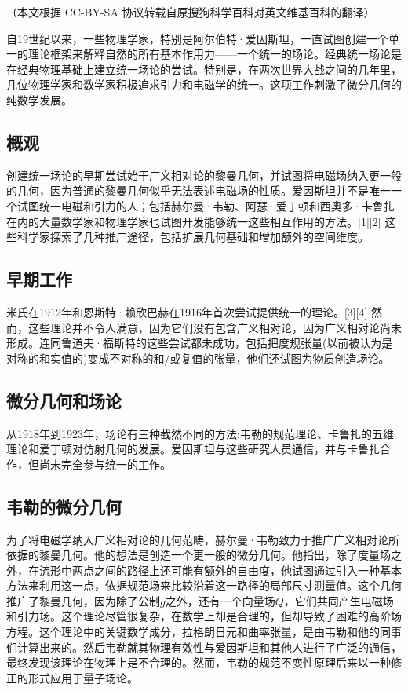 
（本文根据 CC-BY-SA 协议转载自原搜狗科学百科对英文维基百科的翻译）

自19世纪以来，一些物理学家，特别是阿尔伯特·爱因斯坦，一直试图创建一个单一的理论框架来解释自然的所有基本作用力——一个统一的场论。经典统一场论是在经典物理基础上建立统一场论的尝试。特别是，在两次世界大战之间的几年里，几位物理学家和数学家积极追求引力和电磁学的统一。这项工作刺激了微分几何的纯数学发展。

\subsection{概观}

创建统一场论的早期尝试始于广义相对论的黎曼几何，并试图将电磁场纳入更一般的几何，因为普通的黎曼几何似乎无法表述电磁场的性质。爱因斯坦并不是唯一一个试图统一电磁和引力的人；包括赫尔曼·韦勒、阿瑟·爱丁顿和西奥多·卡鲁扎在内的大量数学家和物理学家也试图开发能够统一这些相互作用的方法。[1][2] 这些科学家探索了几种推广途径，包括扩展几何基础和增加额外的空间维度。

\subsection{早期工作}

米氏在1912年和恩斯特·赖欣巴赫在1916年首次尝试提供统一的理论。[3][4] 然而，这些理论并不令人满意，因为它们没有包含广义相对论，因为广义相对论尚未形成。连同鲁道夫·福斯特的这些尝试都未成功，包括把度规张量(以前被认为是对称的和实值的)变成不对称的和/或复值的张量，他们还试图为物质创造场论。

\subsection{微分几何和场论}

从1918年到1923年，场论有三种截然不同的方法:韦勒的规范理论、卡鲁扎的五维理论和爱丁顿对仿射几何的发展。爱因斯坦与这些研究人员通信，并与卡鲁扎合作，但尚未完全参与统一的工作。

\subsection{韦勒的微分几何}

为了将电磁学纳入广义相对论的几何范畴，赫尔曼·韦勒致力于推广广义相对论所依据的黎曼几何。他的想法是创造一个更一般的微分几何。他指出，除了度量场之外，在流形中两点之间的路径上还可能有额外的自由度，他试图通过引入一种基本方法来利用这一点，依据规范场来比较沿着这一路径的局部尺寸测量值。这个几何推广了黎曼几何，因为除了公制$g$之外，还有一个向量场$Q$，它们共同产生电磁场和引力场。这个理论尽管很复杂，在数学上却是合理的，但却导致了困难的高阶场方程。这个理论中的关键数学成分，拉格朗日元和曲率张量，是由韦勒和他的同事们计算出来的。然后韦勒就其物理有效性与爱因斯坦和其他人进行了广泛的通信，最终发现该理论在物理上是不合理的。然而，韦勒的规范不变性原理后来以一种修正的形式应用于量子场论。


